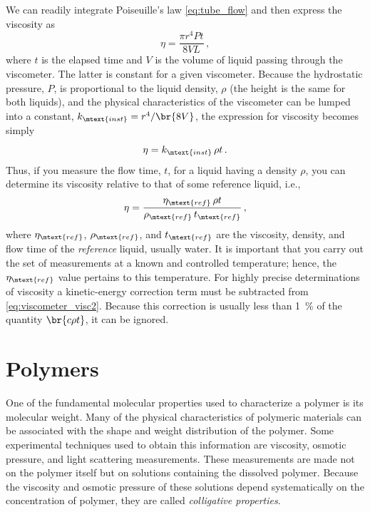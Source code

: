 We can readily integrate Poiseuille's law \cref{eq:tube_flow} and then express the viscosity as
\begin{equation}
	\eta = \frac{\pi r^4 P t}{8 V L} \, ,
	\label{eq:viscometer_visc1}
\end{equation}
where \( t \) is the elapsed time and \( V \) is the volume of liquid passing through the viscometer. 
The latter is constant for a given viscometer. 
Because the hydrostatic pressure, \( P \), is proportional to the liquid density, \( \rho \) (the height is the same for both liquids), and the physical characteristics of the viscometer can be lumped into a constant, \( k_\mtext{inst} = r^4/\br{8 V} \), the expression for viscosity becomes simply
\begin{equation}
	\eta = k_\mtext{inst}\, \rho t \, .
	\label{eq:viscometer_visc2}
\end{equation}
Thus, if you measure the flow time, \( t \), for a liquid having a density \( \rho \), you can determine its viscosity relative to that of some reference liquid, i.e.,
\begin{equation}
	\eta = \frac{\eta_\mtext{ref} \, \rho t}{\rho_\mtext{ref} \, t_\mtext{ref}} \, ,
	\label{eq:ref_viscosity}
\end{equation}
where \( \eta_\mtext{ref} \), \( \rho_\mtext{ref} \), and \( t_\mtext{ref} \) are the viscosity, density, and flow time of the \emph{reference} liquid, usually water. 
It is important that you carry out the set of measurements at a known and controlled temperature; hence, the \( \eta_\mtext{ref} \) value pertains to this temperature. 
For highly precise determinations of viscosity a kinetic-energy correction term must be subtracted from \cref{eq:viscometer_visc2}. 
Because this correction is usually less than \qty{1}{\percent} of the quantity \( \br{c \rho t} \), it can be ignored.


\section{Polymers} %
\label{sec:polymers}

One of the fundamental molecular properties used to characterize a polymer is its molecular weight. Many of the physical characteristics of polymeric materials can be associated with the shape and weight distribution of the polymer. Some experimental techniques used to obtain this information are viscosity, osmotic pressure, and light scattering measurements. These measurements are made not on the polymer itself but on solutions containing the dissolved polymer. Because the viscosity and osmotic pressure of these solutions depend systematically on the concentration of polymer, they are called \emph{colligative properties}. 

